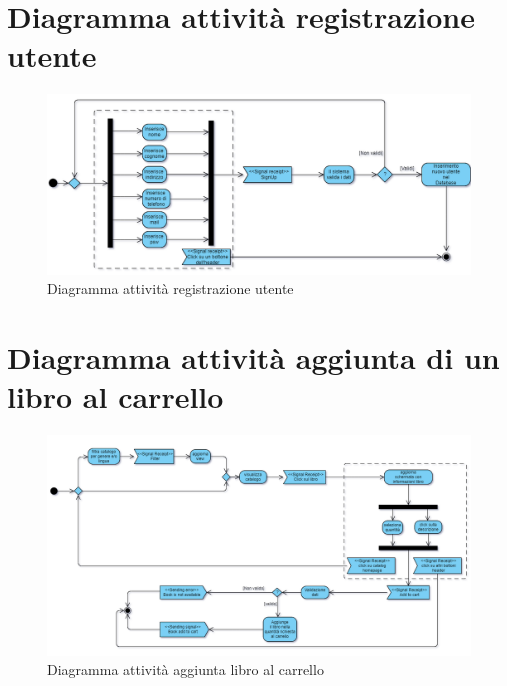 \documentclass[a4paper,11pt]{report}
\begin{document}
\section{Diagramma attività registrazione utente}
\begin{figure}[h!]
	\centering
    	\hspace*{-0.5in}
	\includegraphics[width=1.1\linewidth]{Activity diagrams/activity diagram signUp.png}
	\caption{Diagramma attività registrazione utente}
\end{figure}
\section{Diagramma attività aggiunta di un libro al carrello}

\begin{figure}[h!]
	\centering
    	\hspace*{-0.5in}
	\includegraphics[width=1.3\linewidth]{Activity diagrams/addtocart.png}
	\caption{Diagramma attività aggiunta libro al carrello}
\end{figure}
\clearpage
\end{document}
